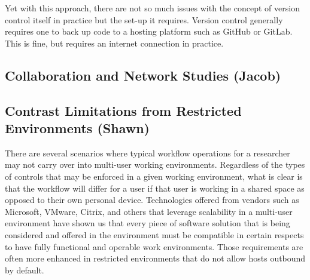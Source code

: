 \documentclass{amia}
\begin{document}
Yet with this approach, there are not so much issues with the concept of version control itself in practice but the set-up it requires.
Version control generally requires one to back up code to a hosting platform such as GitHub or GitLab.
This is fine, but requires an internet connection in practice.

\subsection{Collaboration and Network Studies (Jacob)}

\subsection{Contrast Limitations from Restricted Environments (Shawn)}
        \begin{enumerate}

There are several scenarios where typical workflow operations for a researcher may not carry over into multi-user working environments.  Regardless of the types of controls that may be enforced in a given working environment, what is clear is that the workflow will differ for a user if that user is working in a shared space as opposed to their own personal device.  Technologies offered from vendors such as Microsoft, VMware, Citrix, and others that leverage scalability in a multi-user environment have shown us that every piece of software solution that is being considered and offered in the environment must be compatible in certain respects to have fully functional and operable work environments.  Those requirements are often more enhanced in restricted environments that do not allow hosts outbound by default.


\end{enumerate}
\end{document}
